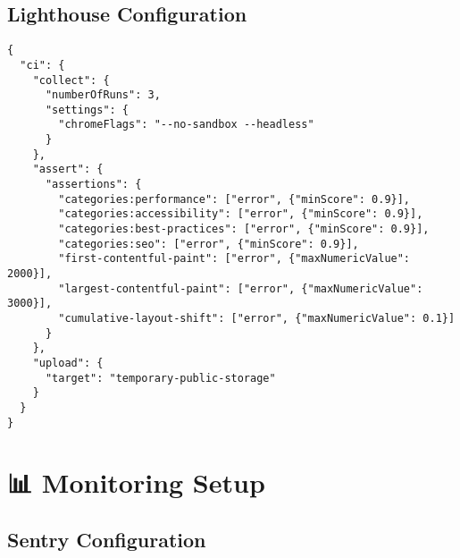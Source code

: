 \documentclass[11pt,a4paper]{article}
\begin{document}
\subsection{Lighthouse Configuration}

\begin{lstlisting}[style=bash, caption=lighthouserc.json]
{
  "ci": {
    "collect": {
      "numberOfRuns": 3,
      "settings": {
        "chromeFlags": "--no-sandbox --headless"
      }
    },
    "assert": {
      "assertions": {
        "categories:performance": ["error", {"minScore": 0.9}],
        "categories:accessibility": ["error", {"minScore": 0.9}],
        "categories:best-practices": ["error", {"minScore": 0.9}],
        "categories:seo": ["error", {"minScore": 0.9}],
        "first-contentful-paint": ["error", {"maxNumericValue": 2000}],
        "largest-contentful-paint": ["error", {"maxNumericValue": 3000}],
        "cumulative-layout-shift": ["error", {"maxNumericValue": 0.1}]
      }
    },
    "upload": {
      "target": "temporary-public-storage"
    }
  }
}
\end{lstlisting}

\section{📊 Monitoring Setup}

\subsection{Sentry Configuration}
\end{document}
